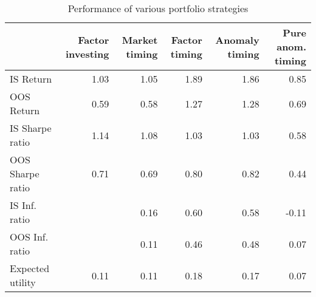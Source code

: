 \begin{table}
\caption{Performance of various portfolio strategies}
\begin{tabular}{lrrrrr}
\toprule
 & Factor investing & Market timing & Factor timing & Anomaly timing & Pure anom. timing \\
\midrule
IS Return & 1.03 & 1.05 & 1.89 & 1.86 & 0.85 \\
OOS Return & 0.59 & 0.58 & 1.27 & 1.28 & 0.69 \\
IS Sharpe ratio & 1.14 & 1.08 & 1.03 & 1.03 & 0.58 \\
OOS Sharpe ratio & 0.71 & 0.69 & 0.80 & 0.82 & 0.44 \\
IS Inf. ratio &  & 0.16 & 0.60 & 0.58 & -0.11 \\
OOS Inf. ratio &  & 0.11 & 0.46 & 0.48 & 0.07 \\
Expected utility & 0.11 & 0.11 & 0.18 & 0.17 & 0.07 \\
\bottomrule
\end{tabular}
\end{table}
